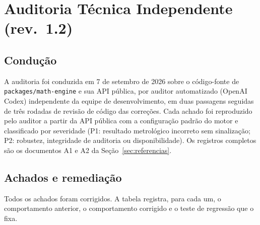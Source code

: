\documentclass[11pt,a4paper]{article}
\newcommand{\docRevision}{1.2}
\newcommand{\auditDate}{7 de setembro de 2026}
\begin{document}
\section{Auditoria Técnica Independente (rev.\ \docRevision)}
\label{sec:auditoria}

\subsection{Condução}

A auditoria foi conduzida em \auditDate{} sobre o código-fonte de \texttt{packages/math-engine} e sua API pública, por auditor automatizado (OpenAI Codex) independente da equipe de desenvolvimento, em duas passagens seguidas de três rodadas de revisão de código das correções. Cada achado foi reproduzido pelo auditor a partir da API pública com a configuração padrão do motor e classificado por severidade (P1: resultado metrológico incorreto sem sinalização; P2: robustez, integridade de auditoria ou disponibilidade). Os registros completos são os documentos A1 e A2 da Seção~\ref{sec:referencias}.

\subsection{Achados e remediação}

Todos os achados foram corrigidos. A tabela registra, para cada um, o comportamento anterior, o comportamento corrigido e o teste de regressão que o fixa.
\end{document}
